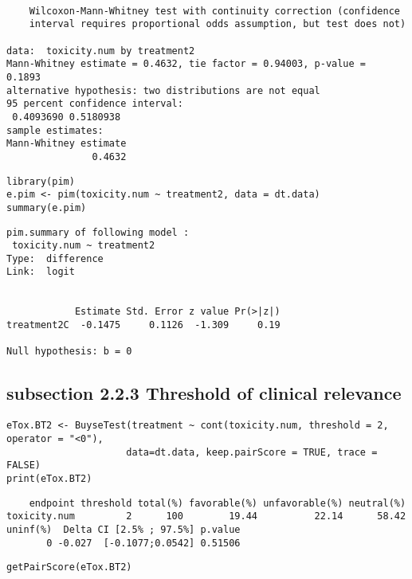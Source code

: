 \documentclass[12pt]{article}
\begin{document}
\begin{verbatim}

	Wilcoxon-Mann-Whitney test with continuity correction (confidence
	interval requires proportional odds assumption, but test does not)

data:  toxicity.num by treatment2
Mann-Whitney estimate = 0.4632, tie factor = 0.94003, p-value =
0.1893
alternative hypothesis: two distributions are not equal
95 percent confidence interval:
 0.4093690 0.5180938
sample estimates:
Mann-Whitney estimate 
               0.4632
\end{verbatim}


\lstset{language=r,label= ,caption= ,captionpos=b,numbers=none}
\begin{lstlisting}
library(pim)
e.pim <- pim(toxicity.num ~ treatment2, data = dt.data)
summary(e.pim)
\end{lstlisting}

\begin{verbatim}
pim.summary of following model : 
 toxicity.num ~ treatment2
Type:  difference 
Link:  logit 


            Estimate Std. Error z value Pr(>|z|)
treatment2C  -0.1475     0.1126  -1.309     0.19

Null hypothesis: b = 0
\end{verbatim}

\subsection{subsection 2.2.3 Threshold of clinical relevance}
\label{sec:org7959203}

\lstset{language=r,label= ,caption= ,captionpos=b,numbers=none}
\begin{lstlisting}
eTox.BT2 <- BuyseTest(treatment ~ cont(toxicity.num, threshold = 2, operator = "<0"),
                     data=dt.data, keep.pairScore = TRUE, trace = FALSE)
print(eTox.BT2)
\end{lstlisting}

\begin{verbatim}
    endpoint threshold total(%) favorable(%) unfavorable(%) neutral(%)
toxicity.num         2      100        19.44          22.14      58.42
uninf(%)  Delta CI [2.5% ; 97.5%] p.value
       0 -0.027  [-0.1077;0.0542] 0.51506
\end{verbatim}



\lstset{language=r,label= ,caption= ,captionpos=b,numbers=none}
\begin{lstlisting}
getPairScore(eTox.BT2)
\end{lstlisting}
\end{document}
